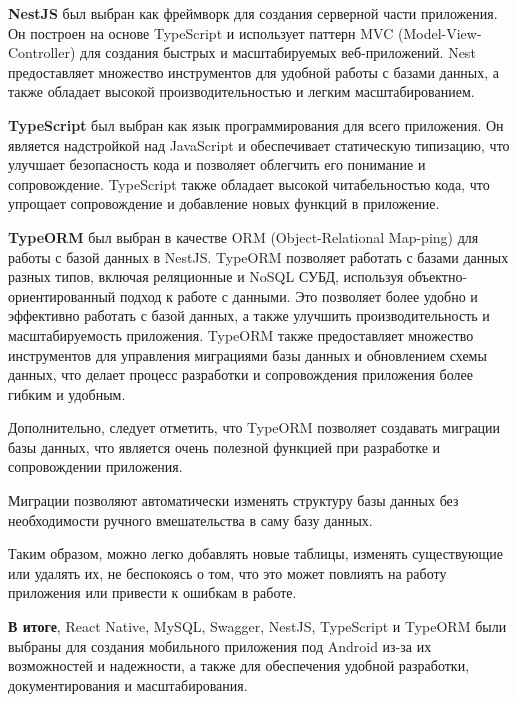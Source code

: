 \textbf{NestJS} \cite{NestJsGuide} был выбран как фреймворк для создания серверной части приложения.
Он построен на основе TypeScript и использует паттерн MVC (Model-View-Controller) для создания быстрых и масштабируемых веб-приложений.
Nest предоставляет множество инструментов для удобной работы с базами данных, а также обладает высокой производительностью и легким масштабированием.

\textbf{TypeScript} \cite{TypeScriptGuide} был выбран как язык программирования для всего приложения.
Он является надстройкой над JavaScript и обеспечивает статическую типизацию, что улучшает безопасность кода и позволяет облегчить его понимание и сопровождение.
TypeScript также обладает высокой читабельностью кода, что упрощает сопровождение и добавление новых функций в приложение.

\textbf{TypeORM} \cite{TypeORM} \cite{TypeOrmQueryRunner} был выбран в качестве ORM (Object-Relational Map-ping) для работы с базой данных в NestJS.
TypeORM позволяет работать с базами данных разных типов, включая реляционные и NoSQL СУБД, используя объектно-ориентированный подход к работе с данными.
Это позволяет более удобно и эффективно работать с базой данных, а также улучшить производительность и масштабируемость приложения.
TypeORM также предоставляет множество инструментов для управления миграциями базы данных и обновлением схемы данных, что делает процесс разработки и сопровождения приложения более гибким и удобным.

Дополнительно, следует отметить, что TypeORM позволяет создавать миграции базы данных,
что является очень полезной функцией при разработке и сопровождении приложения.

Миграции позволяют автоматически изменять структуру базы данных
без необходимости ручного вмешательства в саму базу данных.

Таким образом, можно легко добавлять новые таблицы,
изменять существующие или удалять их, не беспокоясь о том,
что это может повлиять на работу приложения или привести к ошибкам в работе.

\textbf{В итоге}, React Native, MySQL, Swagger, NestJS, TypeScript и TypeORM были выбраны для создания мобильного приложения под Android из-за их возможностей и надежности,
а также для обеспечения удобной разработки, документирования и масштабирования.

\newpage
